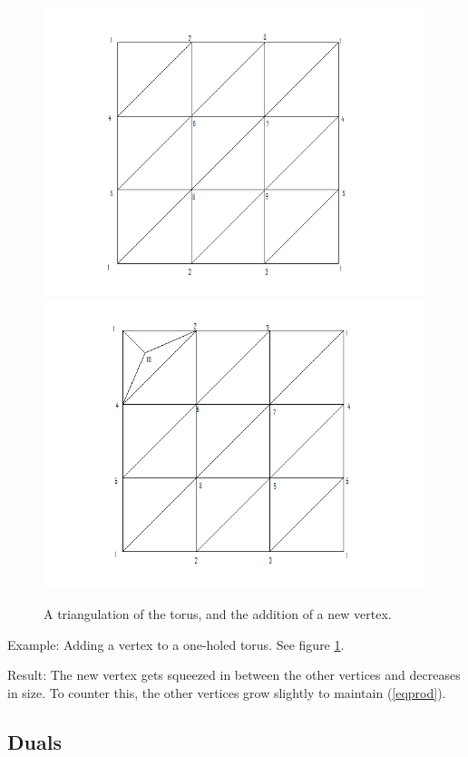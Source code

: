 \documentclass[12pt]{article}
\begin{document}
\begin{figure}
\label{torusaddv}
\includegraphics[scale = 0.5]{torus2.png}
\includegraphics[scale = 0.5]{torus2addvertex.png}
\caption{A triangulation of the torus, and the addition of a new vertex.}
\end{figure}
  
Example: Adding a vertex to a one-holed torus. See figure \ref{torusaddv}. 

Result: The new vertex gets squeezed in between the other vertices and decreases in size. To counter this, the other vertices grow slightly to maintain (\ref{eqprod}). 

\subsection{Duals}
\maketitle
\end{document}

